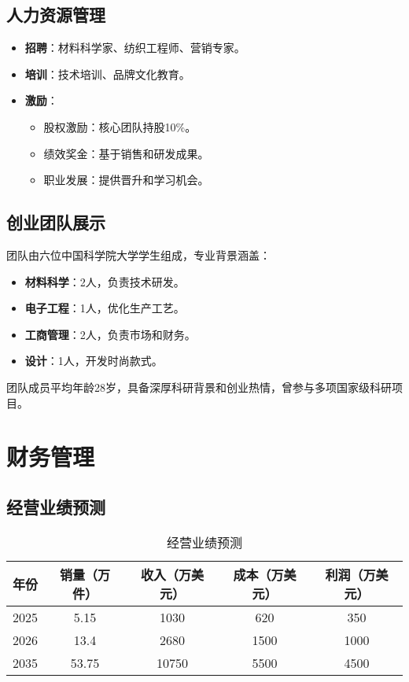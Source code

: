 \documentclass[UTF8]{report}
\theoremstyle{MyLineTheoremStyle} %
\theoremstyle{MyBlockTheoremStyle} %
\theoremstyle{MySubsubsectionStyle} %
\begin{document}
\section{人力资源管理}
\begin{itemize}
    \item \textbf{招聘}：材料科学家、纺织工程师、营销专家。
    \item \textbf{培训}：技术培训、品牌文化教育。
    \item \textbf{激励}：
        \begin{itemize}
            \item 股权激励：核心团队持股10\%。
            \item 绩效奖金：基于销售和研发成果。
            \item 职业发展：提供晋升和学习机会。
        \end{itemize}
\end{itemize}

\section{创业团队展示}
团队由六位中国科学院大学学生组成，专业背景涵盖：
\begin{itemize}
    \item \textbf{材料科学}：2人，负责技术研发。
    \item \textbf{电子工程}：1人，优化生产工艺。
    \item \textbf{工商管理}：2人，负责市场和财务。
    \item \textbf{设计}：1人，开发时尚款式。
\end{itemize}
团队成员平均年龄28岁，具备深厚科研背景和创业热情，曾参与多项国家级科研项目。

\chapter{财务管理}
\section{经营业绩预测}
\begin{table}[h]
    \centering
    \begin{tabular}{|c|c|c|c|c|}
        \hline
        \textbf{年份} & \textbf{销量（万件）} & \textbf{收入（万美元）} & \textbf{成本（万美元）} & \textbf{利润（万美元）} \\
        \hline
        2025 & 5.15 & 1030 & 620 & 350 \\
        \hline
        2026 & 13.4 & 2680 & 1500 & 1000 \\
        \hline
        2035 & 53.75 & 10750 & 5500 & 4500 \\
        \hline
    \end{tabular}
    \caption{经营业绩预测}
\end{table}
\end{document}
